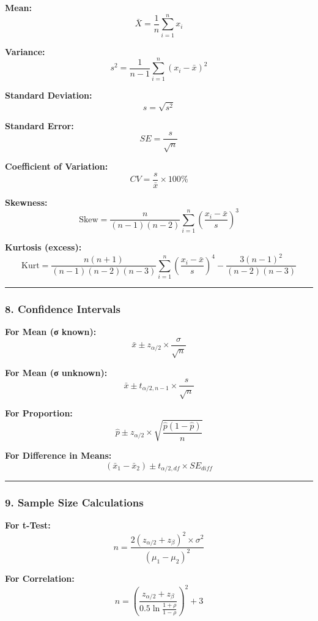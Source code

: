 \documentclass[11pt]{article}
\begin{document}
\textbf{Mean:} \[\bar{X} = \frac{1}{n}\sum_{i=1}^{n} x_i\]

\textbf{Variance:}
\[s^2 = \frac{1}{n-1}\sum_{i=1}^{n}(x_i - \bar{x})^2\]

\textbf{Standard Deviation:} \[s = \sqrt{s^2}\]

\textbf{Standard Error:} \[SE = \frac{s}{\sqrt{n}}\]

\textbf{Coefficient of Variation:}
\[CV = \frac{s}{\bar{x}} \times 100\%\]

\textbf{Skewness:}
\[\text{Skew} = \frac{n}{(n-1)(n-2)}\sum_{i=1}^{n}\left(\frac{x_i - \bar{x}}{s}\right)^3\]

\textbf{Kurtosis (excess):}
\[\text{Kurt} = \frac{n(n+1)}{(n-1)(n-2)(n-3)}\sum_{i=1}^{n}\left(\frac{x_i - \bar{x}}{s}\right)^4 - \frac{3(n-1)^2}{(n-2)(n-3)}\]

\begin{center}\rule{0.5\linewidth}{0.5pt}\end{center}

\subsubsection{\texorpdfstring{\textbf{8. Confidence
Intervals}}{8. Confidence Intervals}}\label{confidence-intervals}

\textbf{For Mean (σ known):}
\[\bar{x} \pm z_{\alpha/2} \times \frac{\sigma}{\sqrt{n}}\]

\textbf{For Mean (σ unknown):}
\[\bar{x} \pm t_{\alpha/2, n-1} \times \frac{s}{\sqrt{n}}\]

\textbf{For Proportion:}
\[\hat{p} \pm z_{\alpha/2} \times \sqrt{\frac{\hat{p}(1-\hat{p})}{n}}\]

\textbf{For Difference in Means:}
\[(\bar{x}_1 - \bar{x}_2) \pm t_{\alpha/2, df} \times SE_{diff}\]

\begin{center}\rule{0.5\linewidth}{0.5pt}\end{center}

\subsubsection{\texorpdfstring{\textbf{9. Sample Size
Calculations}}{9. Sample Size Calculations}}\label{sample-size-calculations}

\textbf{For t-Test:}
\[n = \frac{2(z_{\alpha/2} + z_\beta)^2 \times \sigma^2}{(\mu_1 - \mu_2)^2}\]

\textbf{For Correlation:}
\[n = \left(\frac{z_{\alpha/2} + z_\beta}{0.5\ln\frac{1+\rho}{1-\rho}}\right)^2 + 3\]
\end{document}
